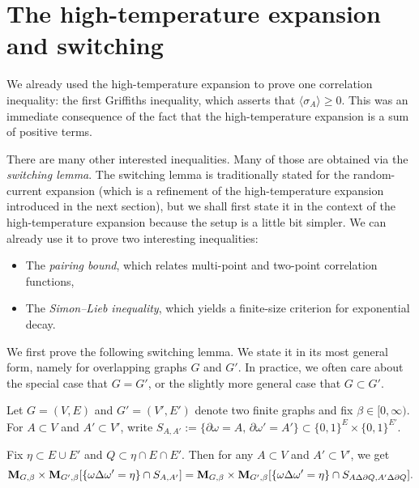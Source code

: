 \section{The high-temperature expansion and switching}

We already used the high-temperature expansion to prove one correlation inequality:
the first Griffiths inequality, which asserts that $\langle\sigma_A\rangle\geq 0$.
This was an immediate consequence of the fact that the high-temperature expansion is a sum of positive terms.

There are many other interested inequalities.
Many of those are obtained via the \emph{switching lemma}.
The switching lemma is traditionally stated for the random-current expansion
(which is a refinement of the high-temperature expansion introduced in the next section),
but we shall first state it in the context of the high-temperature expansion
because the setup is a little bit simpler.
We can already use it to prove two interesting inequalities:
\begin{itemize}
    \item The \emph{pairing bound}, which relates multi-point and two-point correlation functions,
    \item The \emph{Simon--Lieb inequality}, which yields a finite-size criterion for exponential decay.
\end{itemize}

We first prove the following switching lemma.
We state it in its most general form,
namely for overlapping graphs $G$ and $G'$.
In practice, we often care about the special case that $G=G'$, or the slightly more general
case that $G\subset G'$.

\begin{lemma}
    Let $G=(V,E)$ and $G'=(V',E')$ denote two finite graphs and fix $\beta\in[0,\infty)$.
    For $A\subset V$ and $A'\subset V'$,
    write $S_{A,A'}:=\{\partial\omega=A,\,\partial\omega'=A'\}\subset \{0,1\}^E\times\{0,1\}^{E'}$.

    Fix $\eta\subset E\cup E'$
    and $Q\subset \eta\cap E\cap E'$.
    Then for any $A\subset V$ and $A'\subset V'$,
    we get
    \begin{equation}
        \mathbf{M}_{G,\beta}\times\mathbf{M}_{G',\beta}
        [\{\omega\Delta\omega'=\eta\}\cap S_{A,A'}]
        =
        \mathbf{M}_{G,\beta}\times\mathbf{M}_{G',\beta}
        [\{\omega\Delta\omega'=\eta\}\cap S_{A\Delta\partial Q,A'\Delta\partial Q}].
    \end{equation}
\end{lemma}

